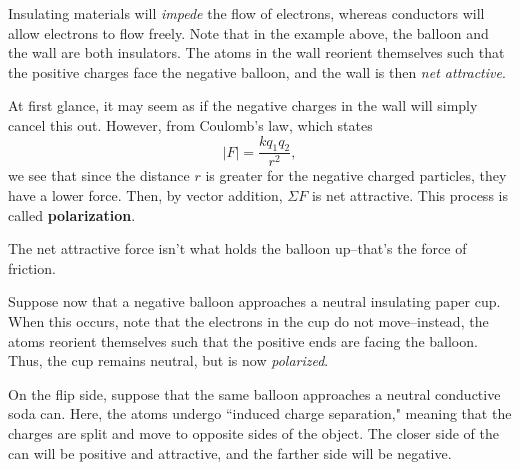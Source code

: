 \documentclass[11pt]{article}
\begin{document}
\begin{center}
\end{center}

Insulating materials will \textit{impede} the flow of electrons, whereas conductors will allow electrons to flow freely. Note that in the example above, the balloon and the wall are both insulators. The atoms in the wall reorient themselves such that the positive charges face the negative balloon, and the wall is then \textit{net attractive}.

At first glance, it may seem as if the negative charges in the wall will simply cancel this out. However, from Coulomb's law, which states
\begin{equation}
	|F| = \frac{kq_1q_2}{r^2},
\end{equation}
we see that since the distance $r$ is greater for the negative charged particles, they have a lower force. Then, by vector addition, $\Sigma F$ is net attractive. This process is called \textbf{polarization}.
\begin{remark}
	The net attractive force isn't what holds the balloon up--that's the force of friction.	
\end{remark}
Suppose now that a negative balloon approaches a neutral insulating paper cup. When this occurs, note that the electrons in the cup do not move--instead, the atoms reorient themselves such that the positive ends are facing the balloon. Thus, the cup remains neutral, but is now \textit{polarized}.

On the flip side, suppose that the same balloon approaches a neutral conductive soda can. Here, the atoms undergo ``induced charge separation," meaning that the charges are split and move to opposite sides of the object. The closer side of the can will be positive and attractive, and the farther side will be negative.
\end{document}
